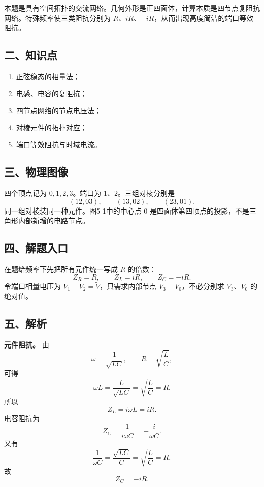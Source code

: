 \documentclass[12pt,a4paper,UTF8]{ctexart}
\newcommand{\tightlist}{\setlength{\itemsep}{0pt}\setlength{\parskip}{0pt}}
\begin{document}
本题是具有空间拓扑的交流网络。几何外形是正四面体，计算本质是四节点复阻抗网络。特殊频率使三类阻抗分别为
\(R\)、\(iR\)、\(-iR\)，从而出现高度简洁的端口等效阻抗。

\subsection{二、知识点}\label{ux4e8cux77e5ux8bc6ux70b9-4}

\begin{enumerate}
\def\labelenumi{\arabic{enumi}.}
\tightlist
\item
  正弦稳态的相量法；
\item
  电感、电容的复阻抗；
\item
  四节点网络的节点电压法；
\item
  对棱元件的拓扑对应；
\item
  端口等效阻抗与时域电流。
\end{enumerate}

\subsection{三、物理图像}\label{ux4e09ux7269ux7406ux56feux50cf-4}

四个顶点记为 \(0,1,2,3\)。端口为 \(1\)、\(2\)。三组对棱分别是 \[
(12,03),\qquad(13,02),\qquad(23,01).
\] 同一组对棱装同一种元件。图5-1中的中心点 \(0\)
是四面体第四顶点的投影，不是三角形内部新增的电路节点。

\subsection{四、解题入口}\label{ux56dbux89e3ux9898ux5165ux53e3-4}

在题给频率下先把所有元件统一写成 \(R\) 的倍数： \[
Z_R=R,\qquad
Z_L=iR,\qquad
Z_C=-iR.
\] 令端口相量电压为 \(V_1-V_2=\widetilde V\)，只需求内部节点
\(V_3-V_0\)，不必分别求 \(V_3\)、\(V_0\) 的绝对值。

\subsection{五、解析}\label{ux4e94ux89e3ux6790-4}

\textbf{元件阻抗。} 由 \[
\omega=\frac1{\sqrt{LC}},
\qquad
R=\sqrt{\frac LC},
\] 可得 \[
\omega L
=\frac{L}{\sqrt{LC}}
=\sqrt{\frac LC}
=R. \tag{1}
\] 所以 \[
Z_L=i\omega L=iR. \tag{2}
\] 电容阻抗为 \[
Z_C=\frac1{i\omega C}
=-\frac{i}{\omega C}. \tag{3}
\] 又有 \[
\frac1{\omega C}
=\frac{\sqrt{LC}}{C}
=\sqrt{\frac LC}
=R,
\] 故 \[
Z_C=-iR. \tag{4}
\]
\end{document}

